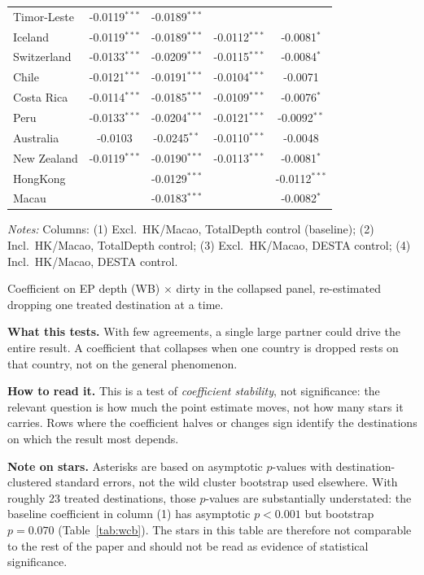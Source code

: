 \begin{table}[htbp]
\begin{threeparttable}
\begin{tabular}{lcccc}
Timor-Leste & -0.0119$^{***}$ & -0.0189$^{***}$ &  &  \\
Iceland & -0.0119$^{***}$ & -0.0189$^{***}$ & -0.0112$^{***}$ & -0.0081$^{*}$ \\
Switzerland & -0.0133$^{***}$ & -0.0209$^{***}$ & -0.0115$^{***}$ & -0.0084$^{*}$ \\
Chile & -0.0121$^{***}$ & -0.0191$^{***}$ & -0.0104$^{***}$ & -0.0071 \\
Costa Rica & -0.0114$^{***}$ & -0.0185$^{***}$ & -0.0109$^{***}$ & -0.0076$^{*}$ \\
Peru & -0.0133$^{***}$ & -0.0204$^{***}$ & -0.0121$^{***}$ & -0.0092$^{**}$ \\
Australia & -0.0103 & -0.0245$^{**}$ & -0.0110$^{***}$ & -0.0048 \\
New Zealand & -0.0119$^{***}$ & -0.0190$^{***}$ & -0.0113$^{***}$ & -0.0081$^{*}$ \\
HongKong &  & -0.0129$^{***}$ &  & -0.0112$^{***}$ \\
Macau &  & -0.0183$^{***}$ &  & -0.0082$^{*}$ \\
\bottomrule
\end{tabular}
\begin{tablenotes}[flushleft]\footnotesize
\item \emph{Notes:} Columns: (1) Excl.\ HK/Macao, TotalDepth control (baseline); (2) Incl.\ HK/Macao, TotalDepth control; (3) Excl.\ HK/Macao, DESTA control; (4) Incl.\ HK/Macao, DESTA control.
\item Coefficient on EP depth (WB) $\times$ dirty in the collapsed panel, re-estimated dropping one treated destination at a time.
\item \textbf{What this tests.} With few agreements, a single large partner could drive the entire result. A coefficient that collapses when one country is dropped rests on that country, not on the general phenomenon.
\item \textbf{How to read it.} This is a test of \emph{coefficient stability}, not significance: the relevant question is how much the point estimate moves, not how many stars it carries. Rows where the coefficient halves or changes sign identify the destinations on which the result most depends.
\item \textbf{Note on stars.} Asterisks are based on asymptotic $p$-values with destination-clustered standard errors, not the wild cluster bootstrap used elsewhere. With roughly 23 treated destinations, those $p$-values are substantially understated: the baseline coefficient in column (1) has asymptotic $p < 0.001$ but bootstrap $p = 0.070$ (Table~\ref{tab:wcb}). The stars in this table are therefore not comparable to the rest of the paper and should not be read as evidence of statistical significance.

\end{tablenotes}
\end{threeparttable}
\end{table}
